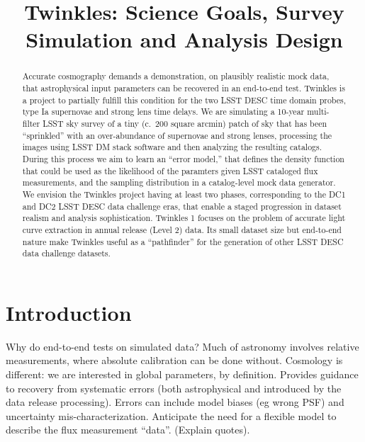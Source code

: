 \documentclass[\docopts]{\docclass}
\begin{document}
\title{ Twinkles: Science Goals, Survey Simulation and Analysis Design }

\maketitlepre

\begin{abstract}

Accurate cosmography demands a demonstration, on plausibly realistic mock data, that astrophysical input parameters can be recovered in an end-to-end test.
Twinkles is a project to partially fulfill this condition for the two LSST DESC time domain probes, type Ia supernovae and strong lens time delays.
We are simulating a 10-year multi-filter LSST sky survey of a tiny (c.\ 200 square arcmin) patch of sky that has been ``sprinkled'' with an over-abundance of supernovae and strong lenses, processing the images using LSST DM stack software and then analyzing the resulting catalogs.
During this process we aim to learn an ``error model,'' that defines the density function that could be used as the likelihood of the paramters given LSST cataloged flux measurements, and the sampling distribution in a catalog-level mock data generator.
We envision the Twinkles project having at least two phases, corresponding to the DC1 and DC2 LSST DESC data challenge eras, that  enable a staged progression in dataset realism and analysis sophistication.
Twinkles 1 focuses on the problem of accurate light curve extraction in annual release (Level 2) data.
Its small dataset size but end-to-end nature make Twinkles useful as a ``pathfinder'' for the generation of other LSST DESC data challenge datasets.

\end{abstract}


\maketitlepost

%

\section{Introduction}
\label{sec:intro}

Why do end-to-end tests on simulated data?
Much of astronomy involves relative measurements, where absolute calibration can be done without. Cosmology is different: we are interested in global parameters, by definition. Provides guidance to recovery from systematic errors (both astrophysical and introduced by the data release processing). Errors can include model biases (eg wrong PSF) and uncertainty mis-characterization. Anticipate the need for a flexible model to describe the flux measurement ``data''. (Explain quotes).
\end{document}
